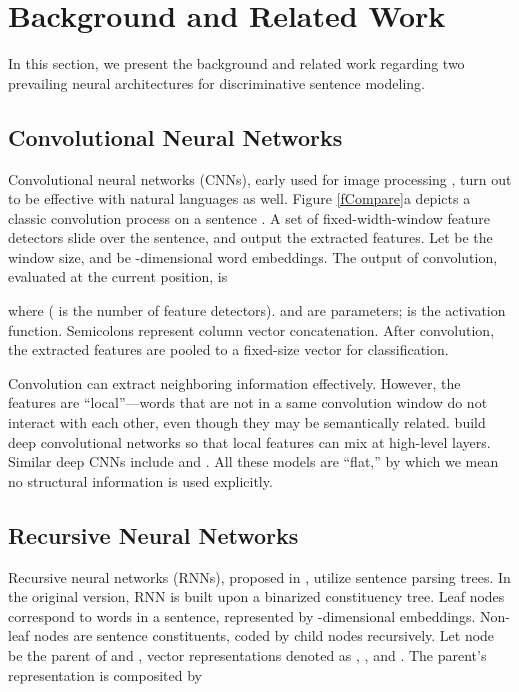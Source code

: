 \documentclass[11pt,a4paper]{article}
\begin{document}
\section{Background and Related Work}\label{sBackground}

In this section, we present the background and related work regarding
two prevailing neural architectures for discriminative sentence modeling.

\subsection{Convolutional Neural Networks}


Convolutional neural networks (CNNs), early used for image processing \cite{lenet},
turn out to be effective with natural languages as well.
Figure \ref{fCompare}a depicts a classic convolution
process on a sentence \cite{unified}.
A set of fixed-width-window feature detectors 
slide over the sentence, and output the extracted features.
Let  be the window size, and 
be -dimensional
word embeddings.
The output of convolution, evaluated at the current position, is

\vspace{-.4cm}


\vspace{-.1cm}
\noindent where  ( is the number of feature detectors).  and  are parameters;  is the activation function. Semicolons represent
 column vector concatenation.
After convolution, the extracted features are pooled to a fixed-size vector for classification.

Convolution can extract neighboring information effectively.
However, the features are ``local''---words that are not in a same convolution window do not interact with each other, even though they may be semantically related.
 build deep convolutional networks so that
local features can mix at high-level layers.
Similar deep CNNs include  and .
All these models are ``flat,'' by which we mean no structural information
is used explicitly.





\subsection{Recursive Neural Networks}

Recursive neural networks (RNNs), proposed in ,
utilize sentence parsing trees.
In the original version, RNN is built upon a binarized constituency tree.
Leaf nodes correspond to words in a sentence, represented by
-dimensional embeddings.
Non-leaf nodes are sentence constituents,
coded by child nodes recursively.
Let node  be the parent of  and ,
 vector representations denoted as
, , and . The parent's representation is composited by
\end{document}
